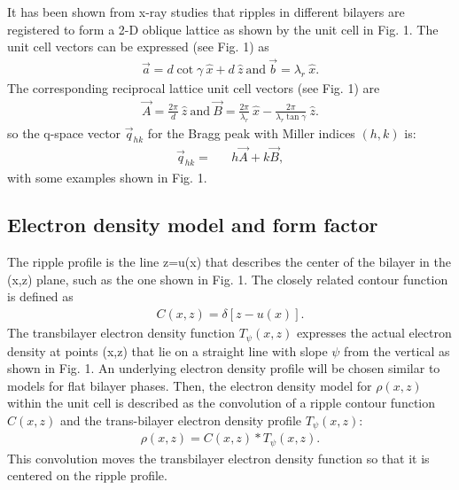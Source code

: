 It has been shown from x-ray studies \cite{Tar73,JanSS79,Ino80,Ale85,%
Wac89a,Kat95} that ripples in different bilayers are registered to form a 
2-D oblique lattice as shown by the unit cell in Fig. 1.
The unit cell vectors can be expressed (see Fig. 1) as
\begin{eqnarray}
\label{realunit}
\vec{a} = d \cot \gamma\ \hat{x} + d\ \hat{z} \ \mbox{and}\ \vec{b} = \lambda_r\ \hat{x}.
\end{eqnarray}
The corresponding reciprocal lattice unit cell vectors (see Fig. 1) are 
\begin{eqnarray}
\label{reciunit}
\vec{A} = \frac{2 \pi}{d}\ \hat{z}\ \mbox{and}\ \vec{B} = \frac{2 \pi}{\lambda_r}\ \hat{x} - \frac{2 \pi}{\lambda_r \tan \gamma}\ \hat{z}.
\end{eqnarray}
so the q-space vector $\vec{q}_{hk}$ for the Bragg peak with Miller indices $(h,k)$
is:
\begin{eqnarray}
\label{qvector}
\vec{q}_{hk} =&& h \vec{A} + k \vec{B} ,
\end{eqnarray}
with some examples shown in Fig. 1.
\subsection{Electron density model and form factor}

The ripple profile is the line z=u(x) that describes the center of the bilayer 
in the (x,z) plane, such as the one shown in Fig. 1.  
The closely related contour function is defined as
\begin{eqnarray}
\label{contour}
C(x,z) = \delta [z - u(x)].
\end{eqnarray}
The transbilayer electron density function $T_{\psi}(x,z)$ expresses the
actual electron density at points (x,z) that lie on a straight line with
slope $\psi$ from the vertical as shown in Fig. 1.  An underlying electron
density profile will be chosen similar to models for flat bilayer phases.
Then, the electron density model for $\rho (x,z)$ within
the unit cell is described as the convolution of a ripple contour
function $C(x,z)$ and the trans-bilayer electron density profile $T_{\psi}(x,z)$:
\begin{eqnarray}
\label{model}
\rho (x,z) = C(x,z) \ast T_{\psi}(x,z).
\end{eqnarray}
This convolution moves the transbilayer electron density function so that
it is centered on the ripple profile.


